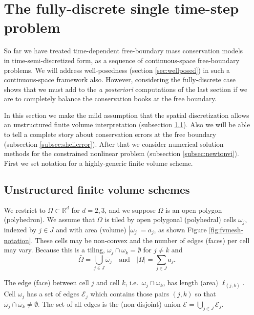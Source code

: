 \documentclass[final,leqno,onefignum,onetabnum]{siamltex1213bueler}
\newcommand\RR{\mathbb{R}}
\begin{document}
\section{The fully-discrete single time-step problem}  \label{sec:spacediscretized}

So far we have treated time-dependent free-boundary mass conservation models in time-semi-discretized form, as a sequence of continuous-space free-boundary problems.  We will address well-posedness (section \ref{sec:wellposed}) in such a continuous-space framework also.  However, considering the fully-discrete case shows that we must add to the \emph{a posteriori} computations of the last section if we are to completely balance the conservation books at the free boundary.

In this section we make the mild assumption that the spatial discretization allows an unstructured finite volume \cite{LeVeque2002} interpretation (subsection \ref{subsec:spacenotation}).  Also we will be able to tell a complete story about conservation errors at the free boundary (subsection \ref{subsec:shellerror}).  After that we consider numerical solution methods for the constrained nonlinear problem (subsection \ref{subsec:newtonvi}).   First we set notation for a highly-generic finite volume scheme.

\subsection{Unstructured finite volume schemes} \label{subsec:spacenotation}  We restrict to $\Omega \subset \RR^d$ for $d=2,3$, and we suppose $\Omega$ is an open polygon (polyhedron).  We assume that $\Omega$ is tiled by open polygonal (polyhedral) cells $\omega_j$, indexed by $j\in J$ and with area (volume) $|\omega_j|=a_j$, as shown Figure \ref{fig:fvmesh-notation}.  These cells may be non-convex and the number of edges (faces) per cell may vary.  Because this is a tiling, $\omega_j \cap \omega_k = \emptyset$ for $j\ne k$ and
\begin{equation}
\bar\Omega = \bigcup_{j\in J} \bar \omega_j \quad \text{and} \quad |\Omega| = \sum_{j\in J} a_j.  \label{eq:tiling}
\end{equation}


The edge (face) between cell $j$ and cell $k$, i.e.~$\bar\omega_j \cap \bar \omega_k$, has length (area) $\ell_{(j,k)}$.  Cell $\omega_j$ has a set of edges $\mathcal{E}_j$ which contains those pairs $(j,k)$ so that $\bar\omega_j \cap \bar \omega_k \ne \emptyset$.  The set of all edges is the (non-disjoint) union $\mathcal{E} = \bigcup_{j\in J} \mathcal{E}_j$.
\end{document}
